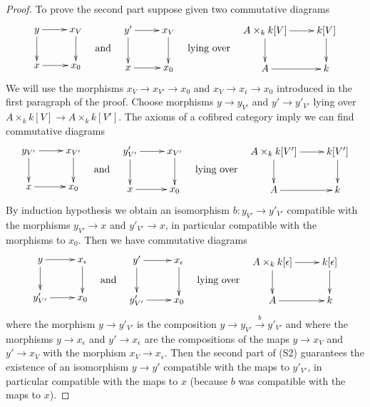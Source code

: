 \documentclass{stacks-project}
\theoremstyle{plain}
\theoremstyle{definition}
\theoremstyle{remark}
\numberwithin{equation}{subsection}
\begin{document}
\begin{proof}
\medskip\noindent
To prove the second part suppose given two commutative
diagrams
$$
\vcenter{
\xymatrix{
y \ar[r] \ar[d] & x_V \ar[d] \\
x \ar[r] & x_0
}
}
\quad\text{and}\quad
\vcenter{
\xymatrix{
y' \ar[r] \ar[d] & x_V \ar[d] \\
x \ar[r] & x_0
}
}
\quad\text{lying over}\quad
\vcenter{
\xymatrix{
A \times_k k[V] \ar[d] \ar[r] & k[V] \ar[d] \\
A \ar[r] & k
}
}
$$
We will use the morphisms $x_V \to x_{V'} \to x_0$ and
$x_V \to x_\epsilon \to x_0$ introduced in the first paragraph of the proof.
Choose morphisms $y \to y_{V'}$ and $y' \to y'_{V'}$
lying over $A \times_k k[V] \to A \times_k k[V']$. The axioms of a
cofibred category imply we can find commutative diagrams
$$
\vcenter{
\xymatrix{
y_{V'} \ar[r] \ar[d] & x_{V'} \ar[d] \\
x \ar[r] & x_0
}
}
\quad\text{and}\quad
\vcenter{
\xymatrix{
y'_{V'} \ar[r] \ar[d] & x_{V'} \ar[d] \\
x \ar[r] & x_0
}
}
\quad\text{lying over}\quad
\vcenter{
\xymatrix{
A \times_k k[V'] \ar[d] \ar[r] & k[V'] \ar[d] \\
A \ar[r] & k
}
}
$$
By induction hypothesis we obtain an isomorphism
$b : y_{V'} \to y'_{V'}$
compatible with the morphisms $y_{V'} \to x$ and $y'_{V'} \to x$,
in particular compatible with the morphisms to $x_0$.
Then we have commutative diagrams
$$
\vcenter{
\xymatrix{
y \ar[r] \ar[d] & x_\epsilon \ar[d] \\
y'_{V'} \ar[r] & x_0
}
}
\quad\text{and}\quad
\vcenter{
\xymatrix{
y' \ar[r] \ar[d] & x_\epsilon \ar[d] \\
y'_{V'} \ar[r] & x_0
}
}
\quad\text{lying over}\quad
\vcenter{
\xymatrix{
A \times_k k[\epsilon] \ar[d] \ar[r] & k[\epsilon] \ar[d] \\
A \ar[r] & k
}
}
$$
where the morphism $y \to y'_{V'}$ is the composition
$y \to y_{V'} \xrightarrow{b} y'_{V'}$ and where the morphisms
$y \to x_\epsilon$ and $y' \to x_\epsilon$ are the compositions of
the maps $y \to x_V$ and $y' \to x_V$ with the morphism $x_V \to x_\epsilon$.
Then the second part of (S2) guarantees the existence of an isomorphism
$y \to y'$ compatible with the maps to $y'_{V'}$, in particular compatible
with the maps to $x$ (because $b$ was compatible with the maps to $x$).
\end{proof}
\end{document}
